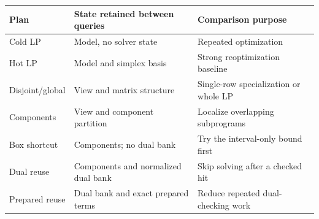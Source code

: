 \begin{tabular}{lll}
\toprule
Plan & State retained between queries & Comparison purpose\\
\midrule
Cold LP & Model, no solver state & Repeated optimization\\
Hot LP & Model and simplex basis & Strong reoptimization baseline\\
Disjoint/global & View and matrix structure & Single-row specialization or whole LP\\
Components & View and component partition & Localize overlapping subprograms\\
Box shortcut & Components; no dual bank & Try the interval-only bound first\\
Dual reuse & Components and normalized dual bank & Skip solving after a checked hit\\
Prepared reuse & Dual bank and exact prepared terms & Reduce repeated dual-checking work\\
\bottomrule
\end{tabular}
